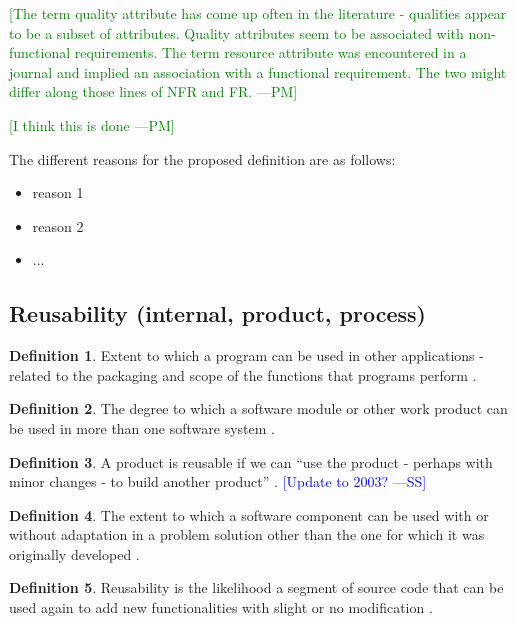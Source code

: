 \documentclass[letterpaper, cleveref]{lipics-v2019}
\newcommand{\authornote}[3]{\textcolor{#1}{[#3 ---#2]}}
\newcommand{\authornote}[3]{}
\newcommand{\wss}[1]{\authornote{blue}{SS}{#1}} %
\newcommand{\pmi}[1]{\authornote{green}{PM}{#1}} %
\theoremstyle{definition}
\newtheorem{defn}{Definition}
\begin{document}
\pmi{The term quality attribute has come up often in the literature -
qualities appear to be a subset of attributes. Quality attributes seem to be
associated with non-functional requirements. The term resource attribute was
encountered in a journal and implied an association with a functional
requirement. The two might differ along those lines of NFR and FR.}

\pmi{I think this is done}

The different reasons for the proposed definition are as follows:

\begin{itemize}
  \item reason 1
  \item reason 2
  \item ...
\end{itemize}


\subsection{Reusability (internal, product, process)} %

\begin{defn}
  Extent to which a program can be used in other applications - related to
  the packaging and scope of the functions that programs perform
  \citep{McCallEtAl1977}.
\end{defn}

\begin{defn}
  The degree to which a software module or other work product can be used in
  more than one software system \citep{IEEEStdGlossarySET1990}.
\end{defn}

\begin{defn}
  A product is reusable if we can ``use the product - perhaps with minor changes
  - to build another product'' \citep{ghezzi1991fundamentals}.  \wss{Update
  to 2003?}
\end{defn}

\begin{defn} \label{ReusabilityDefnSelected}
  The extent to which a software component can be used with or without
  adaptation in a problem solution other than the one for which it was
  originally developed \citep{kalagiakos2003non}.
\end{defn}

\begin{defn}
  Reusability is the likelihood a segment of source code that can be used
  again to add new functionalities with slight or no modification
  \citep{sandhu2010survey}.
\end{defn}
\end{document}
